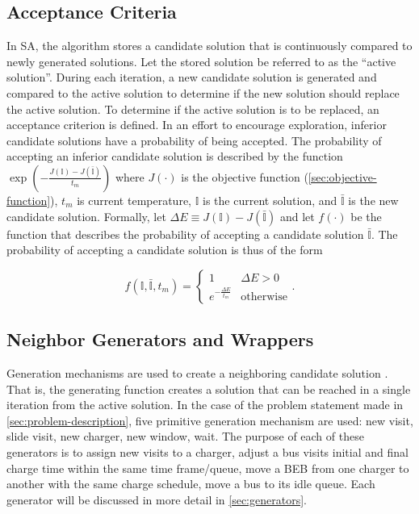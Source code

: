 \documentclass[ee,thesis]{usuthesis}
\newcommand{\I}{\mathbb{I}}                 %
\begin{document}
\subsection{Acceptance Criteria}
\label{sec:acceptance}
In SA, the algorithm stores a candidate solution that is continuously compared to newly generated solutions. Let the
stored solution be referred to as the ``active solution''. During each iteration, a new candidate solution is generated
and compared to the active solution to determine if the new solution should replace the active solution. To determine if
the active solution is to be replaced, an acceptance criterion is defined. In an effort to encourage exploration,
inferior candidate solutions have a probability of being accepted. The probability of accepting an inferior candidate
solution is described by the function \(\exp(-\frac{J(\I) - J(\bar{\I})}{t_m})\) where \(J(\cdot)\) is the objective function
(\ref{sec:objective-function}), \(t_m\) is current temperature, \(\I\) is the current solution, and \(\bar{\I}\) is the new
candidate solution. Formally, let \(\Delta E \equiv J(\I) - J(\bar{\I})\) and let \(f(\cdot)\) be the function that describes the
probability of accepting a candidate solution \(\bar{\I}\). The probability of accepting a candidate solution is thus of
the form \cite{keller-2019-multi-objec}

\begin{equation}
\label{eq:candaccept}
f(\I,\bar{\I},t_m) =
\begin{cases}
  1                   & \Delta E > 0 \\
  e^{- \frac{\Delta E}{t_m}} & \text{otherwise}
\end{cases}\text{.}
\end{equation}

\subsection{Neighbor Generators and Wrappers}
\label{sec:generation-mechanisms}
Generation mechanisms are used to create a neighboring candidate solution \cite{gendreau-2018-handb-metah}. That is,
the generating function creates a solution that can be reached in a single iteration from the active solution. In the
case of the problem statement made in \ref{sec:problem-description}, five primitive generation mechanism are used: new visit,
slide visit, new charger, new window, wait. The purpose of each of these generators is to assign new visits to a
charger, adjust a bus visits initial and final charge time within the same time frame/queue, move a BEB from one charger
to another with the same charge schedule, move a bus to its idle queue. Each generator will be discussed in more detail
in \ref{sec:generators}.
\end{document}
